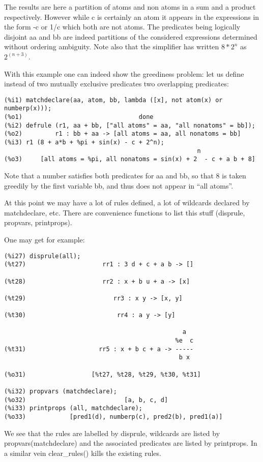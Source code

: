 \documentclass[a4paper,11pt]{article}
\begin{document}
The results are here a partition of atoms and non atoms in a sum and
a product respectively. However while c is certainly an atom it
appears in the expressions in the form -c or 1/c which both are not
atoms. The predicates being logically disjoint aa and bb are indeed
partitions of the considered expressions determined without ordering
ambiguity. Note also that the simplifier has written $8*2^n$ as $2^(n+3)$.

With this example one can indeed show the greediness problem:
let us define instead of two mutually exclusive predicates two
overlapping predicates:
\begin{verbatim}
(%i1) matchdeclare(aa, atom, bb, lambda ([x], not atom(x) or numberp(x)));
(%o1)                                done
(%i2) defrule (r1, aa + bb, ["all atoms" = aa, "all nonatoms" = bb]);
(%o2)         r1 : bb + aa -> [all atoms = aa, all nonatoms = bb]
(%i3) r1 (8 + a*b + %pi + sin(x) - c + 2^n);
                                                     n
(%o3)     [all atoms = %pi, all nonatoms = sin(x) + 2  - c + a b + 8]
\end{verbatim}
Note that a number satisfies both predicates for aa and bb, so that 8
is taken greedily by the first variable bb, and thus does not appear
in ``all atoms''.




At this point we may have a lot of rules defined, a lot of wildcards declared by
matchdeclare, etc. There are convenience functions to list this stuff (disprule,
propvars, printprops).

One may get for example:
\begin{verbatim}
(%i27) disprule(all);
(%t27)                     rr1 : 3 d + c + a b -> []

(%t28)                     rr2 : x + b u + a -> [x]

(%t29)                        rr3 : x y -> [x, y]

(%t30)                         rr4 : a y -> [y]

                                                 a
                                               %e  c
(%t31)                    rr5 : x + b c + a -> -----
                                                b x

(%o31)                  [%t27, %t28, %t29, %t30, %t31]

(%i32) propvars (matchdeclare);
(%o32)                           [a, b, c, d]
(%i33) printprops (all, matchdeclare);
(%o33)            [pred1(d), numberp(c), pred2(b), pred1(a)]
\end{verbatim}
We see that the rules are labelled by disprule, wildcards are listed by
propvars(matchdeclare) and the associated predicates are listed by printprops.
In a similar vein clear\_rules()  kills the existing rules.
\end{document}

